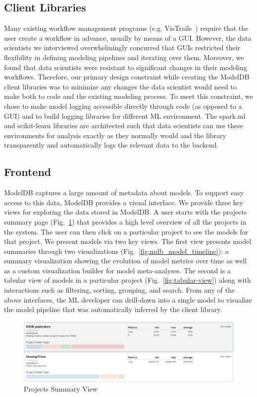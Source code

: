 \documentclass[11pt]{article}
\newcommand{\mdb}{{\sc ModelDB}\xspace}
\newcommand{\dss}{data scientists\xspace}
\newcommand{\ds}{data scientist\xspace}
\newcommand{\mldev}{ML developer\xspace}
\begin{document}
\subsection{Client Libraries}
Many existing workflow management programs (e.g. VisTrails~\cite{callahan2006vistrails}) require that the user create a workflow in advance, usually by means of a GUI. 
However, the \dss we interviewed overwhelmingly concurred that GUIs restricted their flexibility in defining modeling pipelines and iterating over them. 
Moreover, we found that \dss were resistant to significant changes in their modeling workflows.
Therefore, our primary design constraint while creating the \mdb client libraries was to minimize any changes the \ds would need to make both to code and the existing modeling process. To meet this constraint, we chose to make model logging accessible directly through code (as opposed to a GUI) and to build logging libraries for different ML environment. 
The spark.ml and scikit-learn libraries are architected such that \dss can use these environments for analysis exactly as they normally would and the library transparently and automatically logs the relevant data to the backend.
\subsection{Frontend}
\label{sec:mdb_frontend}

\mdb captures a large amount of metadata about models.
To support easy access to this data, \mdb provides a visual interface.
We provide three key views for exploring the data stored in \mdb.
A user starts with the projects summary page (Fig.~\ref{fig:project-summary}) 
that provides a high level overview of all the projects in the system.
The user can then click on a particular project to see the models for that project.
We present models via two key views.
The first view presents model summaries through two visualizations (Fig.~\ref{fig:mdb_model_timeline}): a summary visualization showing the evolution of model metrics over time as well as a custom visualization builder for model meta-analyses.
The second is a tabular view of models in a particular project (Fig.~\ref{fig:tabular-view}) along with interactions such as filtering, sorting, grouping, and search.
From any of the above interfaces, the \mldev can drill-down into a single model to visualize the model pipeline that was automatically inferred by the client library.

\begin{figure}
  \centering
  \includegraphics[trim=0mm 0mm 0mm 0mm,
  clip=true, width=\textwidth]{figs/mdb_dashboard.png}
  \caption{\label{fig:project-summary} Projects Summary View}
\end{figure}
\end{document}
